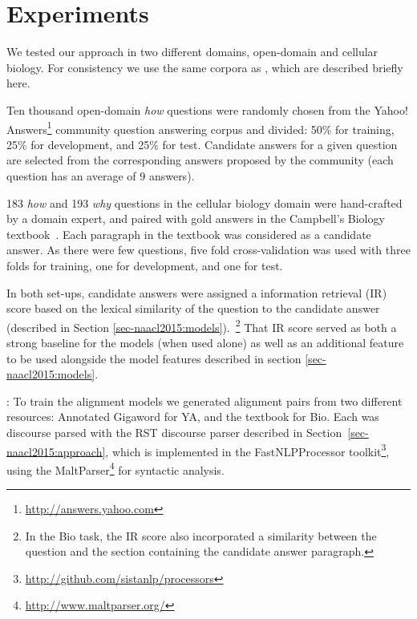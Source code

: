 \section{Experiments}
\label{sec-naacl2015:experiments}



We tested our approach in two different domains, open-domain and cellular biology. For consistency we use the same corpora as \citet{jansen14}, which are described briefly here. 

{}  Ten thousand open-domain \emph{how} questions were randomly chosen from the Yahoo! Answers\footnote{\url{http://answers.yahoo.com}} community question answering corpus and divided: 50\% for training, 25\% for development, and 25\% for test.  Candidate answers for a given question are selected from the corresponding answers proposed by the community (each question has an average of 9 answers).

{} 183 \emph{how} and 193 \emph{why}  questions in the cellular biology domain were hand-crafted by a domain expert, and paired with gold answers in the Campbell's Biology textbook~\citep{Reece:2011}.  Each paragraph in the textbook was considered as a candidate answer.  As there were few questions, five fold cross-validation was used with three folds for training, one for development, and one for test.

In both set-ups, candidate answers were assigned a information retrieval (IR) score based on the lexical similarity of the question to the candidate answer (described in Section \ref{sec-naacl2015:models}).~\footnote{In the Bio task, the IR score also incorporated a similarity between the question and the section containing the candidate answer paragraph.}  That IR score served as both a strong baseline for the models (when used alone) as well as an additional feature to be used alongside the model features described in section \ref{sec-naacl2015:models}.

{}: To train the alignment models we generated alignment pairs from two different resources: Annotated Gigaword \citep{Napoles2012} for YA, and the textbook for Bio.  Each was discourse parsed with the RST discourse parser described in Section~\ref{sec-naacl2015:approach}, which is implemented in the FastNLPProcessor toolkit\footnote{\url{http://github.com/sistanlp/processors}}, using the MaltParser\footnote{\url{http://www.maltparser.org/}} for syntactic analysis.


